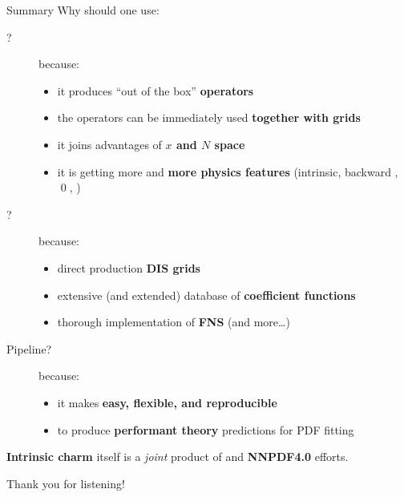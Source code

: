 \documentclass[9pt]{beamer}
\begin{document}
\begin{frame}{Summary}
    Why should one use:
    \begin{description}
        \item[\eko?] because:
            \begin{itemize}
                \item it produces \enquote{out of the box} \textbf{operators}
                \item the operators can be immediately used \textbf{together with grids}
                \item it joins advantages of \textbf{$x$ and $N$ space}
                \item it is getting more and \textbf{more physics
                    features} (intrinsic, backward \vfns, \qed, \nnnlo)
            \end{itemize}
        \item[\yadism?] because:
            \begin{itemize}
                \item direct production \textbf{DIS grids}
                \item extensive (and extended) database of \textbf{coefficient
                    functions}
                \item thorough implementation of \textbf{FNS} (and more\dots)
            \end{itemize}
        \item[Pipeline?] because:
            \begin{itemize}
                \item it makes \textbf{easy, flexible, and reproducible}
                \item to produce \textbf{performant theory} predictions for PDF fitting
            \end{itemize}
                 \end{description}

    \vspace*{15pt}
    \alert{\textbf{Intrinsic charm}} itself is a \textit{joint} product of \eko
    and \textbf{NNPDF4.0} efforts.
\end{frame}

\begin{frame}[standout]
    Thank you for listening!
\end{frame}

\appendix

\section{\eko}
\end{document}
